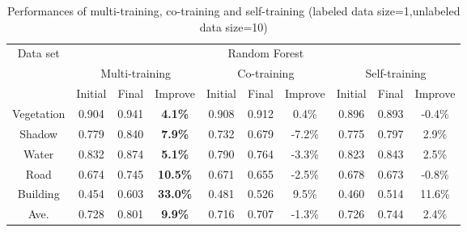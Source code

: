 \documentclass{article}
\begin{document}
\begin{table}
\begin{center}
\begin{tabular}{c|ccc|ccc|ccc}
\toprule
\multirow{3}{*}{Data set} & \multicolumn{9}{c}{Random Forest}                                  \\
\cline{2-10}
                     & \multicolumn{3}{c|}{Multi-training}  & \multicolumn{3}{c|}{Co-training}   & \multicolumn{3}{c}{Self-training}\\
\cline{2-10}
                     & Initial & Final & Improve            & Initial & Final & Improve          & Initial   & Final   & Improve  \\
\midrule
Vegetation           & 0.904    & 0.941  & \textbf{4.1\%}   & 0.908    & 0.912  & 0.4\%          & 0.896     & 0.893    & -0.4\%   \\
Shadow               & 0.779    & 0.840  & \textbf{7.9\%}   & 0.732    & 0.679  & -7.2\%         & 0.775     & 0.797    & 2.9\%   \\
Water                & 0.832    & 0.874  & \textbf{5.1\%}   & 0.790    & 0.764  & -3.3\%         & 0.823     & 0.843    & 2.5\%   \\
Road                 & 0.674    & 0.745  & \textbf{10.5\%}  & 0.671    & 0.655  & -2.5\%         & 0.678     & 0.673    & -0.8\%   \\
Building             & 0.454    & 0.603  & \textbf{33.0\%}  & 0.481    & 0.526  & 9.5\%          & 0.460     & 0.514    & 11.6\%   \\
\midrule
Ave.                 & 0.728    & 0.801  & \textbf{9.9\%}   & 0.716    & 0.707  & -1.3\%         & 0.726     & 0.744    & 2.4\%   \\
\bottomrule
\end{tabular}
\caption{Performances of multi-training, co-training and self-training (labeled data size=1,unlabeled data size=10)}
\end{center}
\end{table}
\end{document}
